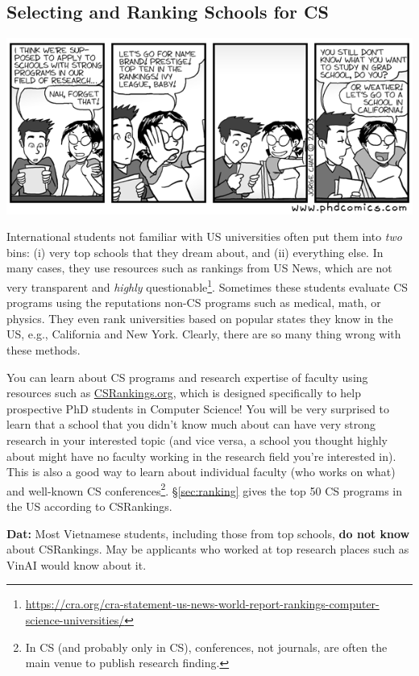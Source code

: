 \documentclass[oneside,11pt]{memoir}
\newenvironment{commentbox}[1][]{
\small
    \begin{mybox}
    {\small \textbf{#1}}
 }{
   \end{mybox}
}
\begin{document}
\subsection{Selecting and Ranking Schools for CS}
   \begin{center}
    \includegraphics[scale=0.5]{c1.png}
   \end{center}

International students not familiar with US universities often put them into \emph{two} bins:  (i) very top schools that they dream about, and (ii) everything else.  In many cases, they use resources such as rankings from US News, which are not very transparent and \emph{highly} questionable\footnote{\url{https://cra.org/cra-statement-us-news-world-report-rankings-computer-science-universities/}}.  Sometimes these students evaluate CS programs using the reputations non-CS programs such as medical, math, or physics.
They even rank universities based on popular states they know in the US, e.g., California and New York.  Clearly, there are so many thing wrong with these methods. 

You can learn about CS programs and research expertise of faculty using resources such as \href{https://csrankings.org}{CSRankings.org}, which is designed specifically to help prospective PhD students in Computer Science!  You will be very surprised to learn that a school that you didn't know much about can have very strong research in your interested topic (and vice versa, a school you thought highly about might have no faculty working in the research field you're interested in). This is also a good way to learn about individual faculty (who works on what) and well-known CS conferences\footnote{In CS (and probably only in CS), conferences, not journals, are often the main venue to publish research finding.}. \S\ref{sec:ranking} gives the top 50 CS programs in the US according to CSRankings.

\begin{commentbox}[Dat:] Most Vietnamese students, including those from top schools, \textbf{do not know} about CSRankings.  May be applicants who worked at top research places such as VinAI would know about it.
\end{commentbox}
\end{document}

